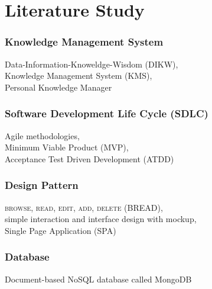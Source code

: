 \documentclass[10pt, compress]{beamer}
\begin{document}

\section{Literature Study}


\begin{frame}[fragile]
  \frametitle{Knowledge Management System}

  Data-Information-Knoweldge-Wisdom (\alert{DIKW}),\\
  Knowledge Management System (\alert{KMS}),\\
  \alert{Personal Knowledge Manager}

\end{frame}


\begin{frame}[fragile]
  \frametitle{Software Development Life Cycle (SDLC)}

  \alert{Agile} methodologies,\\
  Minimum Viable Product (\alert{MVP}),\\
  Acceptance Test Driven Development (\alert{ATDD})

\end{frame}


\begin{frame}[fragile]
  \frametitle{Design Pattern}

  \textsc{browse, read, edit, add, delete} (\alert{BREAD}),\\
  simple interaction and interface design with mockup,\\
  Single Page Application (\alert{SPA})

\end{frame}


\begin{frame}[fragile]
  \frametitle{Database}

  Document-based \alert{NoSQL} database called \alert{MongoDB}

\end{frame}

\end{document}
